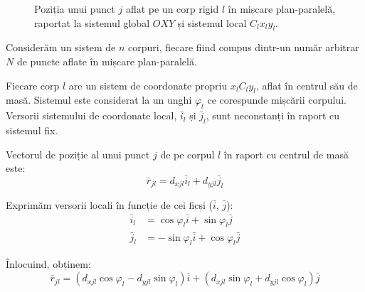 \documentclass[12pt, a4paper]{article}
\begin{document}
\begin{figure}[h!]
\caption{Poziția unui punct $j$ aflat pe un corp rigid $l$ în mișcare plan-paralelă, raportat la sistemul global $OXY$ și sistemul local $C_l x_l y_l$.}
\label{fig:cinematica_corp}
\end{figure}

Considerăm un sistem de $n$ corpuri, fiecare fiind compus dintr-un număr arbitrar $N$ de puncte aflate în mișcare plan-paralelă.

Fiecare corp $l$ are un sistem de coordonate propriu $x_l C_l y_l$, aflat în centrul său de masă. Sistemul este considerat la un unghi $\varphi_l$ ce corespunde mișcării corpului. Versorii sistemului de coordonate local, $\bar{i}_l$ și $\bar{j}_l$, sunt neconstanți în raport cu sistemul fix.

Vectorul de poziție al unui punct $j$ de pe corpul $l$ în raport cu centrul de masă este:
\begin{equation}
    \bar{r}_{jl} = d_{xjl}\bar{i}_l + d_{yjl}\bar{j}_l
\end{equation}

Exprimăm versorii locali în funcție de cei ficși ($\bar{i}$, $\bar{j}$):
\begin{equation}
    \begin{aligned}
        \bar{i}_l &= \cos\varphi_l\bar{i} + \sin\varphi_l\bar{j} \\
        \bar{j}_l &= -\sin\varphi_l\bar{i} + \cos\varphi_l\bar{j}
    \end{aligned}
\end{equation}

Înlocuind, obținem:
\begin{equation}
    \bar{r}_{jl} = (d_{xjl}\cos\varphi_l - d_{yjl}\sin\varphi_l)\bar{i} + (d_{xjl}\sin\varphi_l + d_{yjl}\cos\varphi_l)\bar{j}
\end{equation}
\end{document}
